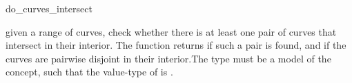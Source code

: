 \ccRefPageBegin

\begin{ccRefFunction}{do_curves_intersect}


{given a range of curves, check whether there is at least one pair of curves
 that intersect in their interior. The function returns  if such
 a pair is found, and  if the curves are pairwise disjoint in
 their interior.The  type must be a model
 of the  concept, such that the value-type of
  is .}

\end{ccRefFunction}

\ccRefPageEnd


